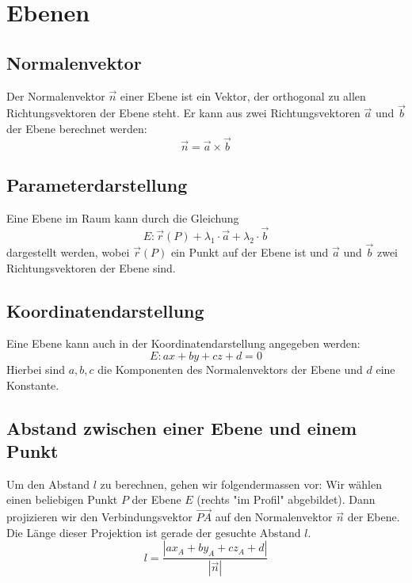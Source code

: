 \documentclass{article}
\begin{document}
\section*{Ebenen}
\begin{minipage}[t]{0.45\textwidth}
    \subsection*{Normalenvektor}
    Der Normalenvektor \( \vec{n} \) einer Ebene ist ein Vektor, der orthogonal zu allen Richtungsvektoren der Ebene steht. Er kann aus zwei Richtungsvektoren \( \vec{a} \) und \( \vec{b} \) der Ebene berechnet werden:
    \begin{equation*}
        \vec{n} = \vec{a} \times \vec{b}
    \end{equation*}
    \subsection*{Parameterdarstellung}
    Eine Ebene im Raum kann durch die Gleichung
    \begin{equation*}
        E: \vec{r}(P) + \lambda_1 \cdot \vec{a} + \lambda_2 \cdot \vec{b}
    \end{equation*}
    dargestellt werden, wobei \( \vec{r}(P) \) ein Punkt auf der Ebene ist und \( \vec{a} \) und \( \vec{b} \) zwei Richtungsvektoren der Ebene sind.
    \subsection*{Koordinatendarstellung}
    Eine Ebene kann auch in der Koordinatendarstellung angegeben werden:
    \begin{equation*}
        E: ax + by + cz + d = 0
    \end{equation*}
    Hierbei sind \( a, b, c \) die Komponenten des Normalenvektors der Ebene und \( d \) eine Konstante.

    \subsection*{Abstand zwischen einer Ebene und einem Punkt}
    Um den Abstand $l$ zu berechnen, gehen wir folgendermassen vor:
    Wir wählen einen beliebigen Punkt $P$ der Ebene $E$ (rechts "im
    Profil" abgebildet). Dann projizieren wir den Verbindungsvektor
    $\overrightarrow{PA}$ auf den Normalenvektor $\vec{n}$ der Ebene. Die Länge dieser
    Projektion ist gerade der gesuchte Abstand $l$.
    \begin{equation*}
        l = \frac{|ax_A + by_A + cz_A + d|}{|\vec{n}|}
    \end{equation*}
\end{minipage}
\end{document}
